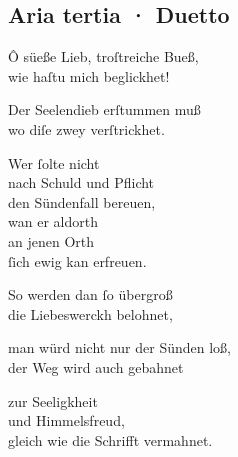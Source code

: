 \documentclass{ees}
\newenvironment{lyrics}[1]{%
  \subsection{#1}\nopagebreak%
  \begin{lyricslist}%
  \let\voice\item%
}{%
  \end{lyricslist}%
}
\begin{document}
\begin{lyrics}{Aria tertia · Duetto}
  \voice[St: Magdalena]
  Ô süeße Lieb, troſtreiche Bueß,\\
  wie haſtu mich beglickhet!

  \voice[St: Michael]
  Der Seelendieb erſtummen muß\\
  wo diſe zwey verſtrickhet.

  \voice[beyde]
  Wer ſolte nicht\\
  nach Schuld und Pflicht\\
  den Sündenfall bereuen,\\
  wan er aldorth\\
  an jenen Orth\\
  ſich ewig kan erfreuen.

  \voice[St: Magdalena]
  So werden dan ſo übergroß\\
  die Liebeswerckh belohnet,

  \voice[St: Michael]
  man würd nicht nur der Sünden loß,\\
  der Weg wird auch gebahnet

  \voice[beyde]
  zur Seeligkheit\\
  und Himmelsfreud,\\
  gleich wie die Schrifft vermahnet.
\end{lyrics}
\end{document}
